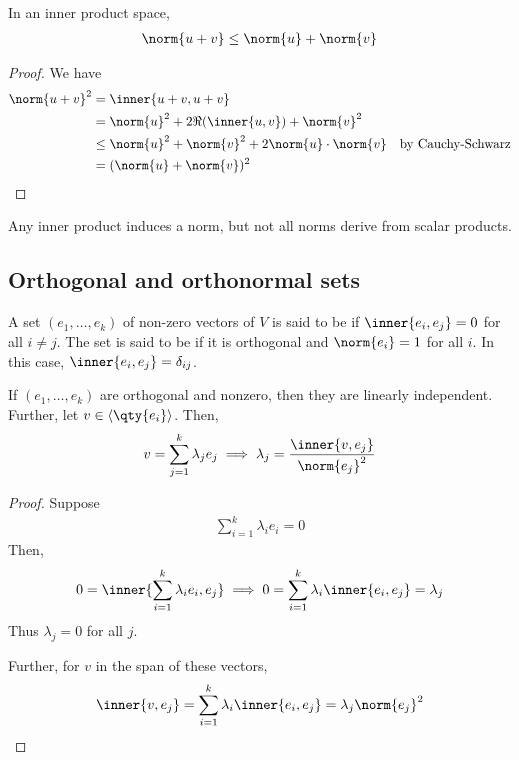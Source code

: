 \begin{corollary}
	In an inner product space,
	\begin{align*}
		\norm{u+v} \leq \norm{u} + \norm{v}
	\end{align*}
\end{corollary}
\begin{proof}
	We have
	\begin{align*}
		\norm{u+v}^2 &= \inner{u+v, u+v} \\
		&= \norm{u}^2 + 2 \Re(\inner{u,v}) + \norm{v}^2 \\
		&\leq \norm{u}^2 + \norm{v}^2 + 2 \norm{u} \cdot \norm{v} \quad \text{by Cauchy-Schwarz}\\
		&= (\norm{u} + \norm{v})^2
	\end{align*}
\end{proof}
\begin{remark}
	Any inner product induces a norm, but not all norms derive from scalar products.
\end{remark}

\subsection{Orthogonal and orthonormal sets}
\begin{definition}
	A set $(e_1, \dots, e_k)$ of non-zero vectors of $V$ is said to be  if $\inner{e_i, e_j} = 0$ for all $i \neq j$.
	The set is said to be  if it is orthogonal and $\norm{e_i} = 1$ for all $i$.
	In this case, $\inner{e_i, e_j} = \delta_{ij}$.
\end{definition}

\begin{lemma}
	If $(e_1, \dots, e_k)$ are orthogonal and nonzero, then they are linearly independent.
	Further, let $v \in \genset{\qty{e_i}}$.
	Then,
	\begin{align*}
		v = \sum_{j=1}^k \lambda_j e_j \implies \lambda_j = \frac{\inner{v, e_j}}{\norm{e_j}^2}
	\end{align*}
\end{lemma}

\begin{proof}
	Suppose
	\begin{align*}
		\sum_{i=1}^k \lambda_i e_i = 0
	\end{align*}
	Then,
	\begin{align*}
		0 = \inner{\sum_{i=1}^k \lambda_i e_i, e_j} \implies 0 = \sum_{i=1}^k \lambda_i \inner{e_i, e_j} = \lambda_j
	\end{align*}
	Thus $\lambda_j = 0$ for all $j$.

	Further, for $v$ in the span of these vectors,
	\begin{align*}
		\inner{v, e_j} = \sum_{i=1}^k \lambda_i \inner{e_i, e_j} = \lambda_j \norm{e_j}^2
	\end{align*}
\end{proof}

